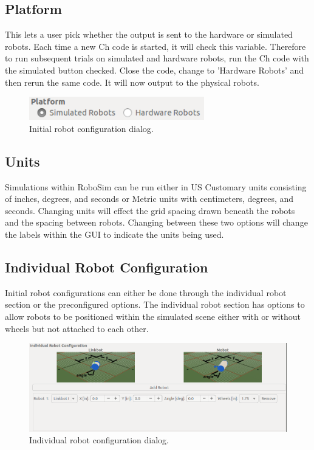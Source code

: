 \documentclass{article}
\begin{document}
\subsection{Platform}
This lets a user pick whether the output is sent to the hardware or simulated
robots.  Each time a new Ch code is started, it will check this variable.
Therefore to run subsequent trials on simulated and hardware robots, run the Ch
code with the simulated button checked.  Close the code, change to 'Hardware
Robots' and then rerun the same code.  It will now output to the physical
robots.
\begin{figure}[H]
	\begin{center}
		\includegraphics[width=3in]{images/platform}
	\end{center}
	\caption{Initial robot configuration dialog.}
	\label{fig:platform}
\end{figure}

\subsection{Units}
Simulations within RoboSim can be run either in US Customary units consisting of
inches, degrees, and seconds or Metric units with centimeters, degrees, and
seconds.  Changing units will effect the grid spacing drawn beneath the robots
and the spacing between robots.  Changing between these two options will
change the labels within the GUI to indicate the units being used.

\subsection{Individual Robot Configuration}
Initial robot configurations can either be done through the individual robot
section or the preconfigured options.  The individual robot section has options
to allow robots to be positioned within the simulated scene either with or
without wheels but not attached to each other.
\begin{figure}[H]
	\begin{center}
		\includegraphics[width=6in]{images/individual}
	\end{center}
	\caption{Individual robot configuration dialog.}
	\label{fig:config}
\end{figure}
\end{document}
